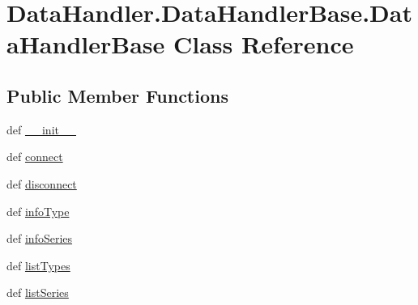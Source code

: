 \hypertarget{classDataHandler_1_1DataHandlerBase_1_1DataHandlerBase}{\section{\-Data\-Handler.\-Data\-Handler\-Base.\-Data\-Handler\-Base \-Class \-Reference}
\label{classDataHandler_1_1DataHandlerBase_1_1DataHandlerBase}
}
\subsection*{\-Public \-Member \-Functions}
\begin{DoxyCompactItemize}
\item 
def \hyperlink{classDataHandler_1_1DataHandlerBase_1_1DataHandlerBase_a12811fd67ed82ee69472555a958c7d00}{\-\_\-\-\_\-init\-\_\-\-\_\-}
\item 
def \hyperlink{classDataHandler_1_1DataHandlerBase_1_1DataHandlerBase_ab7b1566486dd284bb3fbe3dc05f2fd13}{connect}
\item 
def \hyperlink{classDataHandler_1_1DataHandlerBase_1_1DataHandlerBase_a5845568145e08f4317becd943e792bc8}{disconnect}
\item 
def \hyperlink{classDataHandler_1_1DataHandlerBase_1_1DataHandlerBase_a2f76b727ce32f1b057e5764cebbe44aa}{info\-Type}
\item 
def \hyperlink{classDataHandler_1_1DataHandlerBase_1_1DataHandlerBase_a0299f89e49faab52e257ef68786a450a}{info\-Series}
\item 
def \hyperlink{classDataHandler_1_1DataHandlerBase_1_1DataHandlerBase_ac55bec7be3b98c19ed5a5968caaf5ce4}{list\-Types}
\item 
def \hyperlink{classDataHandler_1_1DataHandlerBase_1_1DataHandlerBase_a923bf4fd475d9095d688bb1ca4a65a76}{list\-Series}
\end{DoxyCompactItemize}
